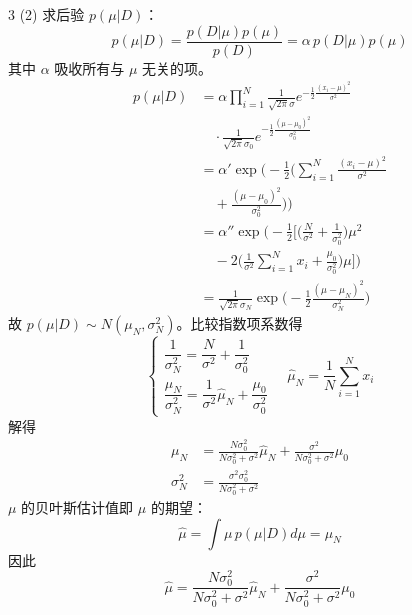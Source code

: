 \documentclass[6pt,a4paper]{extarticle}
\begin{document}
\begin{multicols}{3}
(2) 求后验 $p(\mu|D)$：
$$p(\mu|D)=\frac{p(D|\mu)p(\mu)}{p(D)}=\alpha\,p(D|\mu)p(\mu)$$
其中 $\alpha$ 吸收所有与 $\mu$ 无关的项。
$$\begin{aligned}
p(\mu|D)&=\alpha\prod_{i=1}^N\tfrac{1}{\sqrt{2\pi}\sigma}e^{-\frac12\frac{(x_i-\mu)^2}{\sigma^2}}\\
&\quad\cdot\tfrac{1}{\sqrt{2\pi}\sigma_0}e^{-\frac12\frac{(\mu-\mu_0)^2}{\sigma_0^2}}\\
&=\alpha'\exp\Big(-\tfrac12\Big(\sum_{i=1}^N\tfrac{(x_i-\mu)^2}{\sigma^2}\\
&\quad+\tfrac{(\mu-\mu_0)^2}{\sigma_0^2}\Big)\Big)\\
&=\alpha''\exp\Big(-\tfrac12\Big[\Big(\tfrac N{\sigma^2}+\tfrac1{\sigma_0^2}\Big)\mu^2\\
&\quad-2\Big(\tfrac1{\sigma^2}\sum_{i=1}^Nx_i+\tfrac{\mu_0}{\sigma_0^2}\Big)\mu\Big]\Big)\\
&=\tfrac{1}{\sqrt{2\pi}\sigma_N}\exp\Big(-\tfrac12\tfrac{(\mu-\mu_N)^2}{\sigma_N^2}\Big)
\end{aligned}$$
故 $p(\mu|D)\sim N(\mu_N,\sigma_N^2)$。比较指数项系数得
$$\begin{cases}
\dfrac1{\sigma_N^2}=\dfrac N{\sigma^2}+\dfrac1{\sigma_0^2}\\[4pt]
\dfrac{\mu_N}{\sigma_N^2}=\dfrac1{\sigma^2}\hat\mu_N+\dfrac{\mu_0}{\sigma_0^2}
\end{cases}\quad \hat\mu_N=\frac1N\sum_{i=1}^Nx_i$$
解得
$$\boxed{\begin{aligned}
\mu_N&=\frac{N\sigma_0^2}{N\sigma_0^2+\sigma^2}\hat\mu_N+\frac{\sigma^2}{N\sigma_0^2+\sigma^2}\mu_0\\
\sigma_N^2&=\frac{\sigma^2\sigma_0^2}{N\sigma_0^2+\sigma^2}
\end{aligned}}$$
$\mu$ 的贝叶斯估计值即 $\mu$ 的期望：
$$\hat\mu=\int\mu\,p(\mu|D)d\mu=\mu_N$$
因此
$$\boxed{\hat\mu=\frac{N\sigma_0^2}{N\sigma_0^2+\sigma^2}\hat\mu_N+\frac{\sigma^2}{N\sigma_0^2+\sigma^2}\mu_0}$$
\end{multicols}
\end{document}
